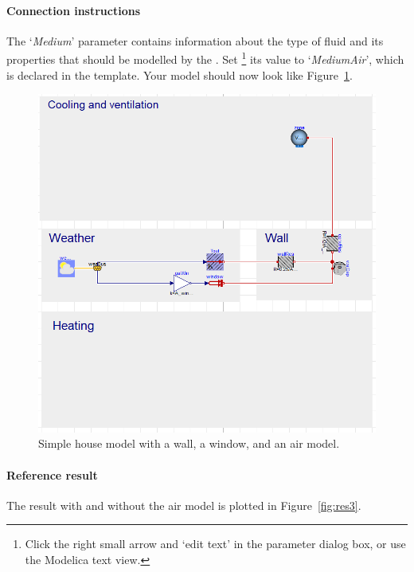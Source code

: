 \documentclass[10pt,a4paper]{article}
\begin{document}
\paragraph{Connection instructions}
The  `\textit{Medium}' parameter contains
information about the type of fluid and its properties
that should be modelled by the .
Set
\footnote{Click the right small arrow and `edit text' in the parameter dialog box, or use the Modelica text view.}
 its value to `\textit{MediumAir}', which is declared in the template. Your model should now look like Figure~\ref{fig:airModel}.
 
 \begin{figure}[h!]
\centering
\includegraphics[scale=0.4]{airModel.png}
\caption{Simple house model with a wall, a window, and an air model.}
\label{fig:airModel}
\end{figure} 

\paragraph{Reference result}
The result with and without the air model
is plotted in Figure~\ref{fig:res3}.

 
\end{document}
